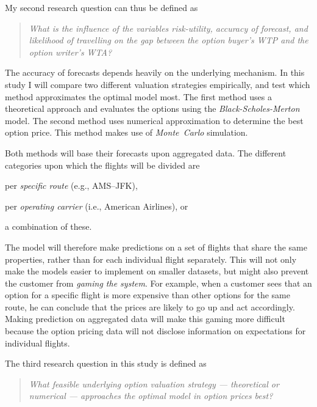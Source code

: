 \noindent
My second research question can thus be defined as
\begin{quote}\emph{What is the influence of the variables risk-utility, accuracy of forecast, and likelihood of travelling on the gap between the option buyer's WTP and the option writer's WTA?}\end{quote}

The accuracy of forecasts depends heavily on the underlying mechanism. In this study I will compare two different valuation strategies empirically, and test which meth\-od ap\-prox\-i\-mates the optimal model most. The first method uses a theoretical approach and evaluates the options using the \emph{Black-Scholes-Merton} model. The second method uses numerical approximation to determine the best option price. This method makes use of \emph{Monte~Carlo} simulation.

Both methods will base their forecasts upon aggregated data. The different categories upon which the flights will be divided are \begin{inparaenum}
\item per \emph{specific route} (e.g., AMS--JFK),
\item per \emph{operating carrier} (i.e., American Airlines), or
\item a combination of these.
\end{inparaenum} The model will therefore make predictions on a set of flights that share the same properties, rather than for each individual flight separately. This will not only make the models easier to implement on smaller datasets, but might also prevent the customer from \textit{gaming the system}. For example, when a customer sees that an option for a specific flight is more expensive than other options for the same route, he can conclude that the prices are likely to go up and act accordingly. Making prediction on aggregated data will make this gaming more difficult because the option pricing data will not disclose information on expectations for individual flights.

\noindent
The third research question in this study is defined as

\begin{quote}\emph{What feasible underlying option valuation strategy --- theoretical or numerical --- approaches the optimal model in option prices best?}\end{quote}

